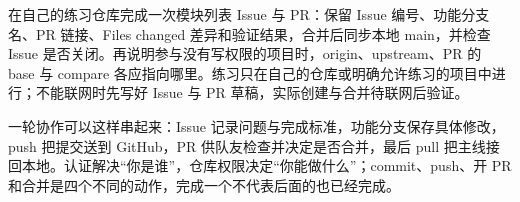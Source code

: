 \begin{exercise}\label{ex:v1-github-collaboration}
在自己的练习仓库完成一次模块列表 Issue 与 PR：保留 Issue 编号、功能分支名、PR 链接、Files changed 差异和验证结果，合并后同步本地 main，并检查 Issue 是否关闭。再说明参与没有写权限的项目时，origin、upstream、PR 的 base 与 compare 各应指向哪里。练习只在自己的仓库或明确允许练习的项目中进行；不能联网时先写好 Issue 与 PR 草稿，实际创建与合并待联网后验证。
\end{exercise}
\begin{conclusion}
一轮协作可以这样串起来：Issue 记录问题与完成标准，功能分支保存具体修改，push 把提交送到 GitHub，PR 供队友检查并决定是否合并，最后 pull 把主线接回本地。认证解决“你是谁”，仓库权限决定“你能做什么”；commit、push、开 PR 和合并是四个不同的动作，完成一个不代表后面的也已经完成。
\end{conclusion}
